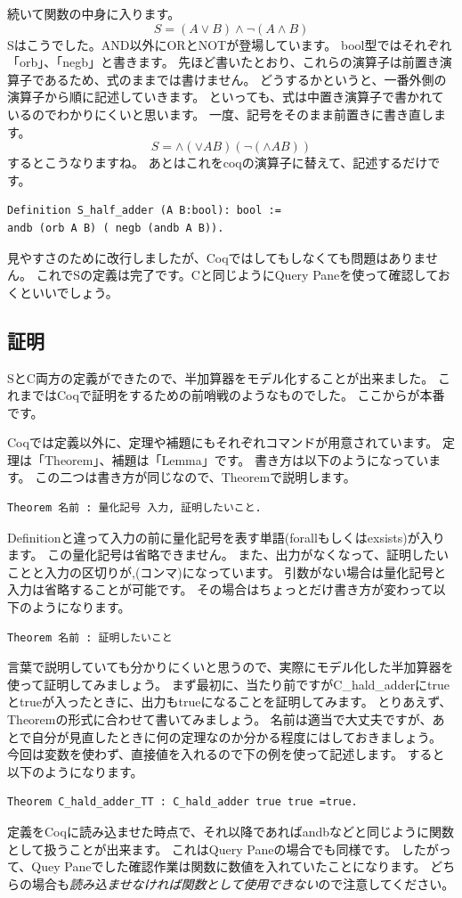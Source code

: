 \documentclass{jsbook}
\begin{document}
続いて関数の中身に入ります。
$$S=(A \vee B) \wedge \lnot (A \wedge B)$$
Sはこうでした。AND以外にORとNOTが登場しています。
bool型ではそれぞれ「orb」、「negb」と書きます。
先ほど書いたとおり、これらの演算子は前置き演算子であるため、式のままでは書けません。
どうするかというと、一番外側の演算子から順に記述していきます。
といっても、式は中置き演算子で書かれているのでわかりにくいと思います。
一度、記号をそのまま前置きに書き直します。
$$S= \wedge (\vee  A B) (\lnot (\wedge A B))$$
するとこうなりますね。
あとはこれをcoqの演算子に替えて、記述するだけです。
\begin{verbatim}
Definition S_half_adder (A B:bool): bool :=
andb (orb A B) ( negb (andb A B)).
\end{verbatim}
見やすさのために改行しましたが、Coqではしてもしなくても問題はありません。
これでSの定義は完了です。Cと同じようにQuery Paneを使って確認しておくといいでしょう。
\subsection*{証明}
SとC両方の定義ができたので、半加算器をモデル化することが出来ました。
これまではCoqで証明をするための前哨戦のようなものでした。
ここからが本番です。

Coqでは定義以外に、定理や補題にもそれぞれコマンドが用意されています。
定理は「Theorem」、補題は「Lemma」です。
書き方は以下のようになっています。
この二つは書き方が同じなので、Theoremで説明します。
\begin{verbatim}
Theorem 名前 : 量化記号 入力, 証明したいこと.
\end{verbatim}
Definitionと違って入力の前に量化記号を表す単語(forallもしくはexsists)が入ります。
この量化記号は省略できません。
また、出力がなくなって、証明したいことと入力の区切りが,(コンマ)になっています。
引数がない場合は量化記号と入力は省略することが可能です。
その場合はちょっとだけ書き方が変わって以下のようになります。
\begin{verbatim}
Theorem 名前 : 証明したいこと
\end{verbatim}

言葉で説明していても分かりにくいと思うので、実際にモデル化した半加算器を使って証明してみましょう。
まず最初に、当たり前ですがC\_hald\_adderにtrueとtrueが入ったときに、出力もtrueになることを証明してみます。
とりあえず、Theoremの形式に合わせて書いてみましょう。
名前は適当で大丈夫ですが、あとで自分が見直したときに何の定理なのか分かる程度にはしておきましょう。
今回は変数を使わず、直接値を入れるので下の例を使って記述します。
すると以下のようになります。
\begin{verbatim}
Theorem C_hald_adder_TT : C_hald_adder true true =true.
\end{verbatim}
定義をCoqに読み込ませた時点で、それ以降であればandbなどと同じように関数として扱うことが出来ます。
これはQuery Paneの場合でも同様です。
したがって、Quey Paneでした確認作業は関数に数値を入れていたことになります。
どちらの場合も\emph{読み込ませなければ関数として使用できない}ので注意してください。
\end{document}
